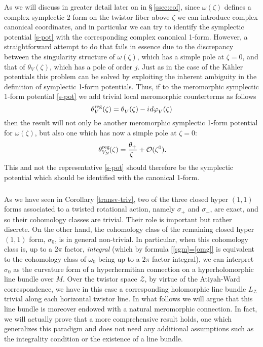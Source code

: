 \documentclass[11pt]{amsart}
\theoremstyle{remark}
\theoremstyle{remark}
\theoremstyle{definition}
\theoremstyle{definition}
\theoremstyle{definition}
\newcommand{\0}{{\scriptstyle 0'}} %
\newcommand{\1}{{\scriptstyle 1'}}
\newcommand{\hp}{\hspace{0.5pt}} %
\newcommand{\npt}{\hspace{-1pt}} %
\begin{document}
As we will discuss in greater detail later on in \mbox{\S\,\ref{ssec:cof}}, since $\omega(\zeta)$ defines a complex symplectic 2-form on the twistor fiber above $\zeta$ we can introduce complex canonical coordinates, and in particular we can try to identify the symplectic potential \eqref{s-pot} with the corresponding complex canonical 1-form.  However, a straightforward attempt to do that fails in essence due to the discrepancy between the singularity structure of $\omega(\zeta)$, which has a simple pole at $\zeta = 0$, and that of $\theta_V(\zeta)$, which has a pole of order $j$. Just as in the case of the K\"ahler potentials this problem can be solved by exploiting the inherent ambiguity in the definition of symplectic 1-form potentials. Thus, if to the meromorphic symplectic 1-form potential \eqref{s-pot} we add trivial local meromorphic counterterms as follows
\begin{equation} \label{s-pot-reg}
\theta^{\text{reg}}_V(\zeta) = \theta^{\phantom{g}}_V(\zeta) - i \hp d\varphi^{\phantom{g}}_V(\zeta)
\end{equation}
then the result will not only be another meromorphic symplectic 1-form potential for $\omega(\zeta)$, but also one which has now a simple pole at $\zeta=0$:
\begin{equation} \label{vph^reg_N_ser}
\theta^{\text{reg}}_{V_N}\npt(\zeta) = \frac{\theta_+}{\zeta \ } + \mathcal{O}(\zeta^0) \rlap{.}
\end{equation}
This and not the representative \eqref{s-pot} should therefore be the symplectic potential which should be identified with the canonical 1-form. 


\subsubsection{}


As we have seen in Corollary \ref{transv-triv}, two of the three closed hyper $(1,1)$ forms associated to a twisted rotational action, namely $\sigma_+$ and $\sigma_-$, are exact, and so their cohomology classes are trivial. Their role is important but rather discrete. On the other hand, the cohomology class of the remaining closed hyper $(1,1)$ form, $\sigma_0$, is in general non-trivial. In particular, when this cohomology class is, up to a $2\pi$ factor, \textit{integral} (which by formula \eqref{[sgm]=[omg]} is equivalent to the cohomology class of  $\omega_0$ being up to a $2\pi$ factor integral), we can interpret $\sigma_0$ as the curvature form of a hyperhermitian connection on a hyperholomorphic line bundle over $M$. Over the twistor space $\mathcal{Z}$, by virtue of the Atiyah-Ward correspondence, we have in this case a corresponding holomorphic line bundle $L_{\mathcal{Z}}$ trivial along each horizontal twistor line. In what follows we will argue that this line bundle is moreover endowed with a natural meromorphic connection. In fact, we will actually prove that a more comprehensive result holds, one which generalizes this paradigm and does not need any additional assumptions such as the integrality condition or the existence of a line bundle. 
\end{document}
